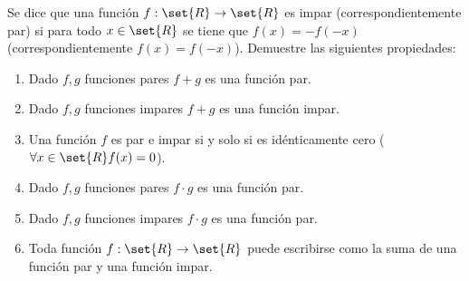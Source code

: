 \documentclass{ayudantia}
\begin{document}
\begin{ans}
    \begin{sol}

    \end{sol}
\end{ans}



\begin{prob}
    Se dice que una función \(f:\set{R}\rightarrow\set{R}\) es impar (correspondientemente par) si para todo \(x\in\set{R}\) se tiene que \(f(x)=-f(-x)\) (correspondientemente \(f(x)=f(-x)\)). Demuestre las siguientes propiedades:
    \begin{enumerate}
        \item Dado \(f,g\) funciones pares \(f+g\) es una función par.
        \item Dado \(f,g\) funciones impares \(f+g\) es una función impar.
        \item Una función \(f\) es par e impar si y solo si es idénticamente cero (\(\forall x\in\set{R}f(x)=0\)).
        \item Dado \(f,g\) funciones pares \(f\cdot g\) es una función par.
        \item Dado \(f,g\) funciones impares \(f\cdot g\) es una función par.
        \item Toda función \(f:\set{R}\rightarrow\set{R}\) puede escribirse como la suma de una función par y una función impar.
    \end{enumerate}
\end{prob}

\begin{ans}
    \begin{sol}

    \end{sol}
\end{ans}
\end{document}
